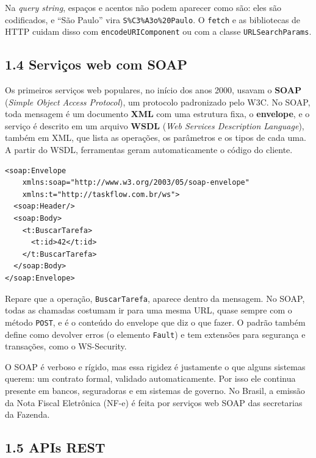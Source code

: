 Na \textit{query string}, espaços e acentos não podem aparecer como são: eles são codificados, e ``São Paulo'' vira \texttt{S\%C3\%A3o\%20Paulo}. O \texttt{fetch} e as bibliotecas de HTTP cuidam disso com \texttt{encodeURIComponent} ou com a classe \texttt{URLSearchParams}.

\subsection{1.4 Serviços web com SOAP}

Os primeiros serviços web populares, no início dos anos 2000, usavam o \textbf{SOAP} (\textit{Simple Object Access Protocol}), um protocolo padronizado pelo W3C. No SOAP, toda mensagem é um documento \textbf{XML} com uma estrutura fixa, o \textbf{envelope}, e o serviço é descrito em um arquivo \textbf{WSDL} (\textit{Web Services Description Language}), também em XML, que lista as operações, os parâmetros e os tipos de cada uma. A partir do WSDL, ferramentas geram automaticamente o código do cliente.

\begin{codigo}
\begin{Verbatim}[breaklines=true, breaksymbolleft={}, fontsize=\footnotesize]
<soap:Envelope
    xmlns:soap="http://www.w3.org/2003/05/soap-envelope"
    xmlns:t="http://taskflow.com.br/ws">
  <soap:Header/>
  <soap:Body>
    <t:BuscarTarefa>
      <t:id>42</t:id>
    </t:BuscarTarefa>
  </soap:Body>
</soap:Envelope>
\end{Verbatim}
\end{codigo}

Repare que a operação, \texttt{BuscarTarefa}, aparece dentro da mensagem. No SOAP, todas as chamadas costumam ir para uma mesma URL, quase sempre com o método \texttt{POST}, e é o conteúdo do envelope que diz o que fazer. O padrão também define como devolver erros (o elemento \texttt{Fault}) e tem extensões para segurança e transações, como o WS-Security.

O SOAP é verboso e rígido, mas essa rigidez é justamente o que alguns sistemas querem: um contrato formal, validado automaticamente. Por isso ele continua presente em bancos, seguradoras e em sistemas de governo. No Brasil, a emissão da Nota Fiscal Eletrônica (NF-e) é feita por serviços web SOAP das secretarias da Fazenda.

\subsection{1.5 APIs REST}

